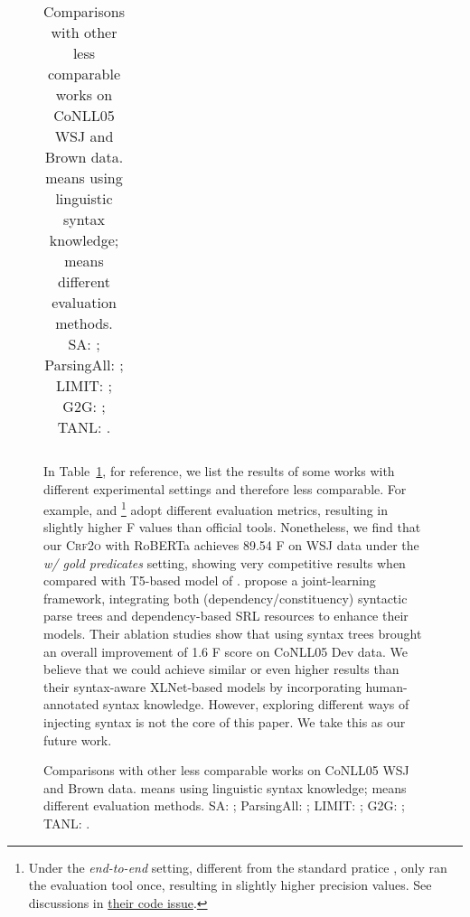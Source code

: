 \documentclass[11pt]{article}
\begin{document}
\begin{figure}[tb!]
\begin{table}[tb!]
\begin{small}
\begin{tabular}{l ccc ccc}
            \bottomrule
        \end{tabular}
        \caption{
            Comparisons with other less comparable works on CoNLL05 WSJ and Brown data.
             means using linguistic syntax knowledge;
             means different evaluation methods.
            SA: \citet{strubell-etal-2018-lisa}; ParsingAll: \citet{zhou-etal-2020-parsing}; LIMIT: \citet{zhou-etal-2020-limit}; G2G: \citet{mohammadshahi-etal-2021-g2g}; TANL: \citet{paolini-etal-2021-structured}.
        }
        \label{table:incomparable}
    \end{small}
\end{table}

In Table~\ref{table:incomparable}, for reference, we list the results of some works with different experimental settings and therefore less comparable.
For example, \citet{paolini-etal-2021-structured} and \citet{strubell-etal-2018-lisa}\footnote{
    Under the \emph{end-to-end} setting, different from the standard pratice \cite{he-etal-2018-jointly}, \citet{strubell-etal-2018-lisa} only ran the evaluation tool once, resulting in slightly higher precision values.
    See discussions in \href{https://github.com/strubell/LISA/issues/9}{their code issue}.
}
adopt different evaluation metrics, resulting in slightly higher F values than official tools.
Nonetheless, we find that our \textsc{Crf2o} with RoBERTa achieves 89.54 F on WSJ data under the \emph{w/ gold predicates} setting, showing very competitive results when compared with T5-based model of \citet{paolini-etal-2021-structured}.
\citet{zhou-etal-2020-parsing} propose a joint-learning framework, integrating both (dependency/constituency) syntactic parse trees and dependency-based SRL resources to enhance their models.
Their ablation studies show that using syntax trees brought an overall improvement of 1.6 F score on CoNLL05 Dev data.
We believe that we could achieve similar or even higher results than their syntax-aware XLNet-based models by incorporating human-annotated syntax knowledge.
However, exploring different ways of injecting syntax is not the core of this paper.
We take this as our future work.


\end{figure}
\end{document}
